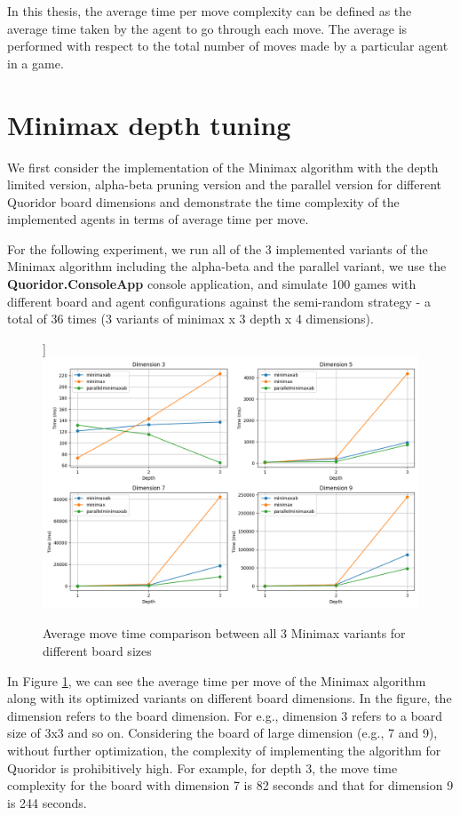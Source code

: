 In this thesis, the average time per move complexity can be defined as the average time taken by the agent to go through each move. The average is performed with respect to the total number of moves made by a particular agent in a game.

\section{Minimax depth tuning}

We first consider the implementation of the Minimax algorithm with the depth limited version, alpha-beta pruning version and the parallel version for different Quoridor board dimensions and demonstrate the time complexity of the implemented agents in terms of average time per move. 

For the following experiment, we run all of the 3 implemented variants of the Minimax algorithm including the alpha-beta and the parallel variant, we use the \textbf{Quoridor.ConsoleApp} console application, and simulate 100 games with different board and agent configurations against the semi-random strategy - a total of 36 times (3 variants of minimax x 3 depth x 4 dimensions).

\begin{figure}[!ht]
]
    \centering
    \includegraphics[width=\linewidth]{../img/performance.png}
    \caption{Average move time comparison between all 3 Minimax variants for different board sizes}
    \label{fig:minimax_performance_comp}
\end{figure}

In Figure \ref{fig:minimax_performance_comp}, we can see the average time per move of the Minimax algorithm along with its optimized variants on different board dimensions. In the figure, the dimension refers to the board dimension. For e.g., dimension 3 refers to a board size of 3x3 and so on. Considering the board of large dimension (e.g., 7 and 9), without further optimization, the complexity of implementing the algorithm for Quoridor is prohibitively high. For example, for depth 3, the move time complexity for the board with dimension 7 is 82 seconds and that for dimension 9 is 244 seconds.

